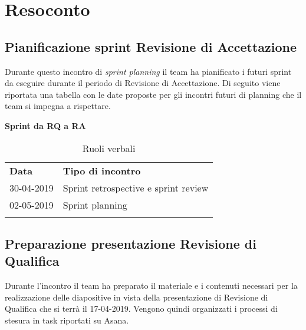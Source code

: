 \clearpage
\section{Resoconto}
	\subsection{Pianificazione sprint Revisione di Accettazione}
	\label{sec:sprint}
	Durante questo incontro di \textit{sprint planning} il team ha pianificato i futuri sprint da eseguire durante il periodo di Revisione di Accettazione. Di seguito viene riportata una tabella con le date proposte per gli incontri futuri di planning che il team si impegna a rispettare.
	\begin{center}
		\textbf{Sprint da RQ a RA}
		\renewcommand{\arraystretch}{1.5}
		\begin{longtable}{  p{2.5cm} p{6cm} }
			\rowcolor{tableHeadYellow}
			\textbf{Data}&\textbf{Tipo di incontro}\\
			30-04-2019 & Sprint retrospective e sprint review \\
			02-05-2019 & Sprint planning\\
			\rowcolor{white}
			\caption{Ruoli verbali}
			\label{sec:tabella2}
		\end{longtable}	
	\end{center}
	\subsection{Preparazione presentazione Revisione di Qualifica}
	\label{sec:presentazione}
	Durante l'incontro il team ha preparato il materiale e i contenuti necessari per la realizzazione delle diapositive in vista della presentazione di Revisione di Qualifica che si terrà il 17-04-2019.
	Vengono quindi organizzati i processi di stesura in task riportati su Asana.
